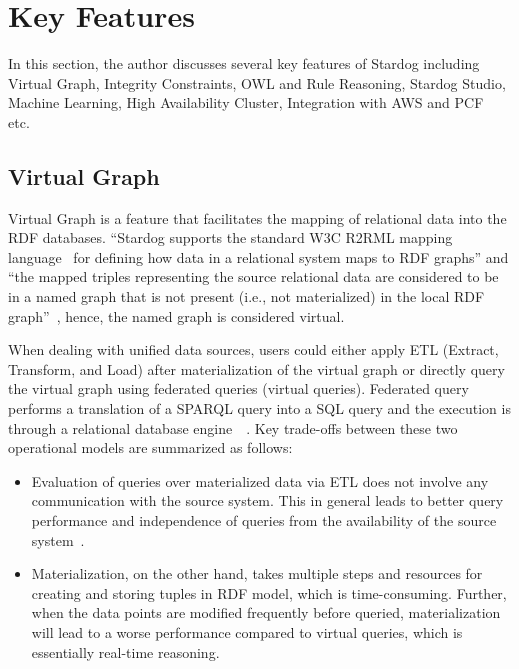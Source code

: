 \section{Key Features}
\label{s:keyf}
	In this section, the author discusses several key features of Stardog 
	including Virtual Graph, Integrity Constraints, OWL and Rule 
	Reasoning, Stardog Studio, Machine Learning, High Availability Cluster, 
	Integration with AWS and PCF etc.\

	\subsection{Virtual Graph}
		Virtual Graph is a feature that facilitates the mapping of relational data 
		into the RDF databases. ``Stardog supports the standard W3C R2RML 
		mapping language~\cite{hid-sp18-405-www-stardog-r2rml} for defining 
		how data in a relational system maps to RDF graphs'' and ``the mapped 
		triples representing the source relational data are considered to be in a 
		named graph that is not present (i.e., not materialized) in the local RDF 
		graph''~\cite{hid-sp18-405-blog-stardog-virtual}, hence, the named 
		graph is considered virtual.
		
		When dealing with unified data sources, users could either apply ETL 
		(Extract, Transform, and Load) after materialization of the virtual graph 
		or 	directly query the virtual graph using federated queries (virtual 
		queries). Federated query performs a translation of a SPARQL query into 
		a SQL query and the execution is through a relational database 
		engine~\cite{hid-sp18-405-blog-stardog-virtual2}~\cite{hid-sp18-405-diego2017ontop-stardog}.
		Key trade-offs between these two operational models are summarized 
		as follows:
		
		 \begin{itemize}
		 	
			\item Evaluation of queries over materialized data via ETL does not 
			involve any communication with the source system. This in general 
			leads to better query performance and independence of queries from 
			the availability of the source 
			system~\cite{hid-sp18-405-blog-stardog-virtual}.
			
			\item Materialization, on the other hand, takes multiple steps and 
			resources for creating and storing tuples in RDF model, which is 
			time-consuming. Further, when the data points are modified 
			frequently before queried, materialization will lead to a worse 
			performance compared to virtual queries, which is essentially 
			real-time reasoning.
			
		\end{itemize}
	
